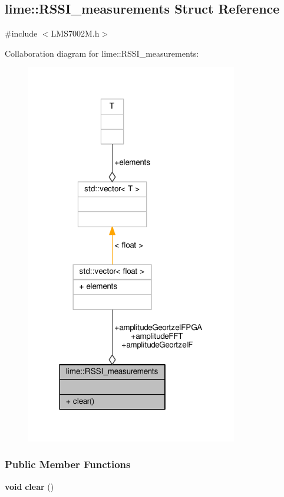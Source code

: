 \subsection{lime\+:\+:R\+S\+S\+I\+\_\+measurements Struct Reference}
\label{structlime_1_1RSSI__measurements}


{\ttfamily \#include $<$L\+M\+S7002\+M.\+h$>$}



Collaboration diagram for lime\+:\+:R\+S\+S\+I\+\_\+measurements\+:
\nopagebreak
\begin{figure}[H]
\begin{center}
\leavevmode
\includegraphics[width=262pt]{d9/daa/structlime_1_1RSSI__measurements__coll__graph}
\end{center}
\end{figure}
\subsubsection*{Public Member Functions}
\begin{DoxyCompactItemize}
\item 
{\bf void} {\bf clear} ()
\end{DoxyCompactItemize}
